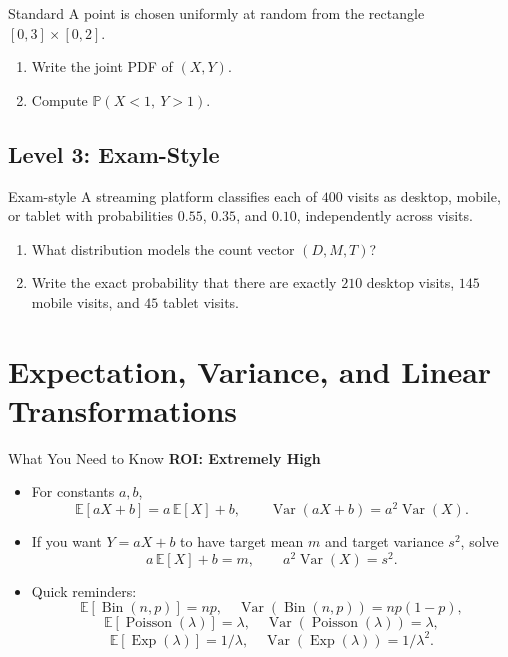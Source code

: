 \documentclass[12pt]{article}
\newcommand{\EE}{\mathbb{E}}
\newcommand{\PP}{\mathbb{P}}
\newcommand{\Var}{\operatorname{Var}}
\newcommand{\Bin}{\operatorname{Bin}}
\newcommand{\Pois}{\operatorname{Poisson}}
\newcommand{\Exp}{\operatorname{Exp}}
\newcommand{\writespace}[1]{\vspace*{#1}}
\newcommand{\medws}{\writespace{1.8cm}}
\newcommand{\longws}{\writespace{2.8cm}}
\newcommand{\roiline}[1]{\textbf{ROI: #1}}
\newcounter{problem}[section]
\begin{document}
\begin{practiceproblem}{Standard}
A point is chosen uniformly at random from the rectangle $[0,3]\times[0,2]$.
\begin{enumerate}
  \item Write the joint PDF of $(X,Y)$.
  \item Compute $\PP(X<1,\ Y>1)$.
\end{enumerate}
\end{practiceproblem}
\medws

\subsection*{Level 3: Exam-Style}

\begin{practiceproblem}{Exam-style}
A streaming platform classifies each of $400$ visits as desktop, mobile, or tablet with probabilities $0.55$, $0.35$, and $0.10$, independently across visits.
\begin{enumerate}
  \item What distribution models the count vector $(D,M,T)$?
  \item Write the exact probability that there are exactly $210$ desktop visits, $145$ mobile visits, and $45$ tablet visits.
\end{enumerate}
\end{practiceproblem}
\longws

\clearpage

\section{Expectation, Variance, and Linear Transformations}

\begin{summarybox}{What You Need to Know}
\roiline{Extremely High}
\begin{itemize}
  \item For constants $a,b$,
  \[
    \EE[aX+b]=a\,\EE[X]+b,
    \qquad
    \Var(aX+b)=a^2\Var(X).
  \]
  \item If you want $Y=aX+b$ to have target mean $m$ and target variance $s^2$, solve
  \[
    a\,\EE[X]+b=m,
    \qquad
    a^2\Var(X)=s^2.
  \]
  \item Quick reminders:
  \[
    \EE[\Bin(n,p)]=np,\quad \Var(\Bin(n,p))=np(1-p),
  \]
  \[
    \EE[\Pois(\lambda)]=\lambda,\quad \Var(\Pois(\lambda))=\lambda,
  \]
  \[
    \EE[\Exp(\lambda)]=1/\lambda,\quad \Var(\Exp(\lambda))=1/\lambda^2.
  \]
\end{itemize}
\end{summarybox}
\end{document}
